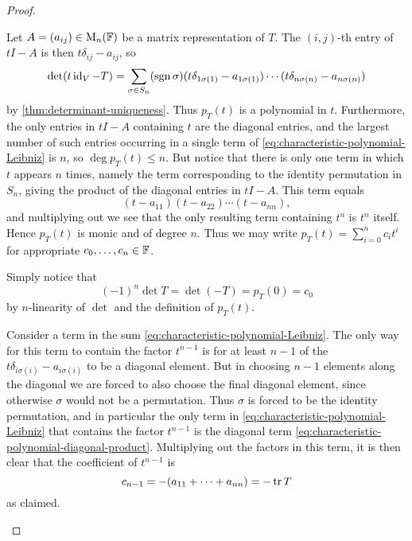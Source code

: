 \begin{proof}
\begin{proofsec*}
    \item[\itemref{enum:characteristic-polynomial-monic}]
    Let $A = (a_{ij}) \in \mathrm{M}_{n}(\mathbb{F})$ be a matrix representation of $T$. The $(i,j)$-th entry of $tI - A$ is then $t\delta_{ij} - a_{ij}$, so
    \begin{equation}
        \label{eq:characteristic-polynomial-Leibniz}
        \det(t \operatorname{id}_V - T)
            = \sum_{\sigma \in S_n} (\operatorname{sgn}\sigma) (t\delta_{1\sigma(1)} - a_{1\sigma(1)}) \cdots (t\delta_{n\sigma(n)} - a_{n \sigma(n)})
    \end{equation}
    by \cref{thm:determinant-uniqueness}. Thus $p_T(t)$ is a polynomial in $t$. Furthermore, the only entries in $tI - A$ containing $t$ are the diagonal entries, and the largest number of such entries occurring in a single term of \cref{eq:characteristic-polynomial-Leibniz} is $n$, so $\deg p_T(t) \leq n$. But notice that there is only one term in which $t$ appears $n$ times, namely the term corresponding to the identity permutation in $S_n$, giving the product of the diagonal entries in $tI-A$. This term equals
    \begin{equation}
        \label{eq:characteristic-polynomial-diagonal-product}
        (t-a_{11})(t-a_{22}) \cdots (t-a_{nn}),
    \end{equation}
    and multiplying out we see that the only resulting term containing $t^n$ is $t^n$ itself. Hence $p_T(t)$ is monic and of degree $n$. Thus we may write $p_T(t) = \sum_{i=0}^n c_i t^i$ for appropriate $c_0, \ldots, c_n \in \mathbb{F}$.

    \item[\itemref{enum:characteristic-polynomial-constant-term}]
    Simply notice that
    \begin{equation*}
        (-1)^n \det T
            = \det(-T)
            = p_T(0)
            = c_0
    \end{equation*}
    by $n$-linearity of $\det$ and the definition of $p_T(t)$.

    \item[\itemref{enum:characteristic-polynomial-coefficient}]
    Consider a term in the sum \cref{eq:characteristic-polynomial-Leibniz}. The only way for this term to contain the factor $t^{n-1}$ is for at least $n-1$ of the $t\delta_{i\sigma(i)} - a_{i\sigma(i)}$ to be a diagonal element. But in choosing $n-1$ elements along the diagonal we are forced to also choose the final diagonal element, since otherwise $\sigma$ would not be a permutation. Thus $\sigma$ is forced to be the identity permutation, and in particular the only term in \cref{eq:characteristic-polynomial-Leibniz} that contains the factor $t^{n-1}$ is the diagonal term \cref{eq:characteristic-polynomial-diagonal-product}. Multiplying out the factors in this term, it is then clear that the coefficient of $t^{n-1}$ is
    \begin{equation*}
        c_{n-1}
            = - (a_{11} + \cdots + a_{nn})
            = - \operatorname{tr} T
    \end{equation*}
    as claimed.


\end{proofsec*}
\end{proof}
